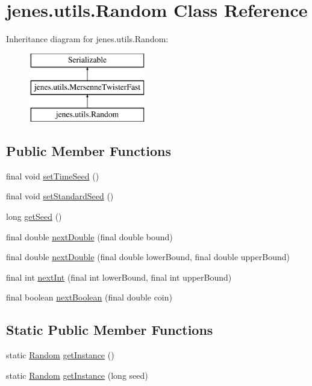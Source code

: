 \hypertarget{classjenes_1_1utils_1_1_random}{\section{jenes.\-utils.\-Random Class Reference}
\label{classjenes_1_1utils_1_1_random}
}
Inheritance diagram for jenes.\-utils.\-Random\-:\begin{figure}[H]
\begin{center}
\leavevmode
\includegraphics[height=3.000000cm]{classjenes_1_1utils_1_1_random}
\end{center}
\end{figure}
\subsection*{Public Member Functions}
\begin{DoxyCompactItemize}
\item 
final void \hyperlink{classjenes_1_1utils_1_1_random_a6eec3abcf133f7ce43d6a13441523a01}{set\-Time\-Seed} ()
\item 
final void \hyperlink{classjenes_1_1utils_1_1_random_a484017ff9c5473f7fc3fc7b52cb92433}{set\-Standard\-Seed} ()
\item 
long \hyperlink{classjenes_1_1utils_1_1_random_a55f9b0a836c137e520658f55ad806859}{get\-Seed} ()
\item 
final double \hyperlink{classjenes_1_1utils_1_1_random_abe2919ddf9245e0576591fa0ea26593f}{next\-Double} (final double bound)
\item 
final double \hyperlink{classjenes_1_1utils_1_1_random_a19babaa9c19de0243430cef2c445df9c}{next\-Double} (final double lower\-Bound, final double upper\-Bound)
\item 
final int \hyperlink{classjenes_1_1utils_1_1_random_ab066d2d2f6d32c89598c552a9dadedc0}{next\-Int} (final int lower\-Bound, final int upper\-Bound)
\item 
final boolean \hyperlink{classjenes_1_1utils_1_1_random_a16e9050a46f8218ec8e0f73c6456a5db}{next\-Boolean} (final double coin)
\end{DoxyCompactItemize}
\subsection*{Static Public Member Functions}
\begin{DoxyCompactItemize}
\item 
static \hyperlink{classjenes_1_1utils_1_1_random}{Random} \hyperlink{classjenes_1_1utils_1_1_random_aa8b8341f82ccf69de0b44c9f6f174820}{get\-Instance} ()
\item 
static \hyperlink{classjenes_1_1utils_1_1_random}{Random} \hyperlink{classjenes_1_1utils_1_1_random_a83dd69fffe081a48e58702c0f118b12e}{get\-Instance} (long seed)
\end{DoxyCompactItemize}
